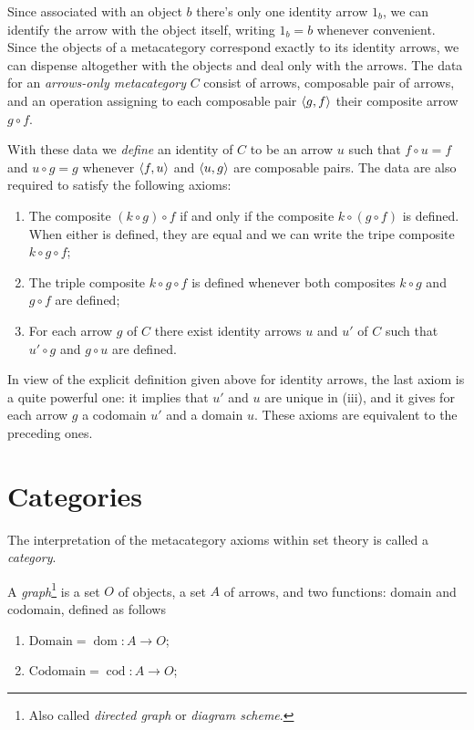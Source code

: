 \documentclass[oneside, 10pt, notitlepage]{book}
\begin{document}

Since associated with an object \(b\) there's only one identity arrow \(1_b\), we can identify the arrow with the object itself, writing \(1_b = b\) whenever convenient. Since the objects of a metacategory correspond exactly to its identity arrows, we can dispense altogether with the objects and deal only with the arrows. The data for an \emph{arrows-only metacategory} \(C\) consist of arrows, composable pair of arrows, and an operation assigning to each composable pair \(\left\langle g,f \right\rangle\) their composite arrow \(g\circ f\).\par

With these data we \emph{define} an identity of \(C\) to be an arrow \(u\) such that \(f\circ u = f\) and \(u\circ g = g\) whenever \(\left\langle f,u \right\rangle\) and \(\left\langle u,g \right\rangle\) are composable pairs. The data are also required to satisfy the following axioms:
\begin{enumerate}
	\item The composite \((k\circ g)\circ f\) if and only if the composite \(k\circ (g\circ f)\) is defined. When either is defined, they are equal and we can write the tripe composite \(k\circ g\circ f\);
	\item The triple composite \(k\circ g\circ f\) is defined whenever both composites \(k \circ g\) and \(g \circ f\) are defined;
	\item For each arrow \(g\) of \(C\) there exist identity arrows \(u\) and \(u'\) of \(C\) such that \(u'\circ g\) and \(g\circ u\) are defined.
\end{enumerate}
In view of the explicit definition given above for identity arrows, the last axiom is a quite powerful one: it implies that \(u'\) and \(u\) are unique in (iii), and it gives for each arrow \(g\) a codomain \(u'\) and a domain \(u\). These axioms are equivalent to the preceding ones.

\section{Categories}

The interpretation of the metacategory axioms within set theory is called a \emph{category}.\par

\begin{definition}[Graph]
	A \emph{graph}\footnote{Also called \emph{directed graph} or \emph{diagram scheme}.} is a set \(O\) of objects, a set \(A\) of arrows, and two functions: domain and codomain, defined as follows
	\begin{enumerate}
		\item \(\text{Domain} = \operatorname{dom}:A\to O\);
		\item \(\text{Codomain} = \operatorname{cod}:A\to O\);
	\end{enumerate}
\end{definition}
\end{document}
